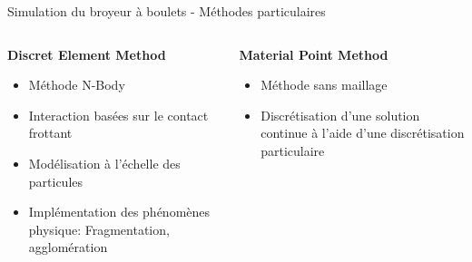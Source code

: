 \documentclass[aspectratio=169]{beamer} %
\begin{document}
\begin{frame}{Simulation du broyeur à boulets - Méthodes particulaires}
    \vspace{-0.25cm}
    \begin{columns}[t]
        \begin{column}{0.5\textwidth}
            \textbf{Discret Element Method} \\
            \begin{figure}[b]
            \end{figure}
            \begin{itemize}
                \item Méthode N-Body
                \item Interaction basées sur le contact frottant
                \item Modélisation à l'échelle des particules
                \item Implémentation des phénomènes physique: Fragmentation, agglomération
            \end{itemize}
            \vfill

        \end{column}

        \begin{column}{0.5\textwidth}
            \textbf{Material Point Method} \\
            \begin{figure}[b]
            \end{figure}
            \begin{itemize}
                \item Méthode sans maillage
                \item Discrétisation d'une solution continue à l'aide d'une discrétisation particulaire
            \end{itemize}
            \vfill

        \end{column}
    \end{columns}
\end{frame}
\end{document}
